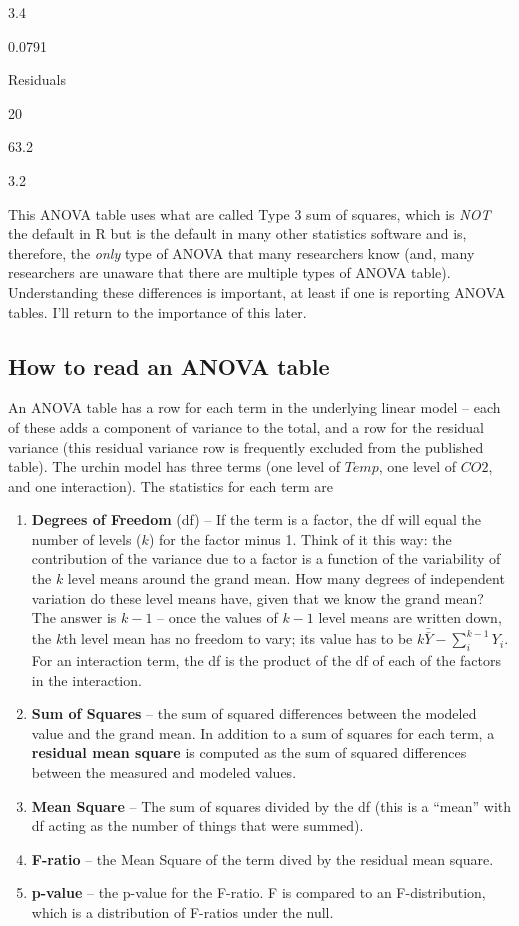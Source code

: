 \documentclass[]{book}
\providecommand{\tightlist}{%
  \setlength{\itemsep}{0pt}\setlength{\parskip}{0pt}}
\begin{document}
3.4

0.0791

Residuals

20

63.2

3.2

This ANOVA table uses what are called Type 3 sum of squares, which is
\emph{NOT} the default in R but is the default in many other statistics
software and is, therefore, the \emph{only} type of ANOVA that many
researchers know (and, many researchers are unaware that there are
multiple types of ANOVA table). Understanding these differences is
important, at least if one is reporting ANOVA tables. I'll return to the
importance of this later.

\subsection{How to read an ANOVA
table}\label{how-to-read-an-anova-table}

An ANOVA table has a row for each term in the underlying linear model --
each of these adds a component of variance to the total, and a row for
the residual variance (this residual variance row is frequently excluded
from the published table). The urchin model has three terms (one level
of \(Temp\), one level of \(CO2\), and one interaction). The statistics
for each term are

\begin{enumerate}
\def\labelenumi{\arabic{enumi}.}
\tightlist
\item
  \textbf{Degrees of Freedom} (df) -- If the term is a factor, the df
  will equal the number of levels (\(k\)) for the factor minus 1. Think
  of it this way: the contribution of the variance due to a factor is a
  function of the variability of the \(k\) level means around the grand
  mean. How many degrees of independent variation do these level means
  have, given that we know the grand mean? The answer is \(k-1\) -- once
  the values of \(k-1\) level means are written down, the \(k\)th level
  mean has no freedom to vary; its value has to be
  \(k\bar{\bar{Y}} - \sum_i^{k-1}{Y_i}\). For an interaction term, the
  df is the product of the df of each of the factors in the interaction.
\item
  \textbf{Sum of Squares} -- the sum of squared differences between the
  modeled value and the grand mean. In addition to a sum of squares for
  each term, a \textbf{residual mean square} is computed as the sum of
  squared differences between the measured and modeled values.
\item
  \textbf{Mean Square} -- The sum of squares divided by the df (this is
  a ``mean'' with df acting as the number of things that were summed).
\item
  \textbf{F-ratio} -- the Mean Square of the term dived by the residual
  mean square.
\item
  \textbf{p-value} -- the p-value for the F-ratio. F is compared to an
  F-distribution, which is a distribution of F-ratios under the null.
\end{enumerate}
\end{document}

